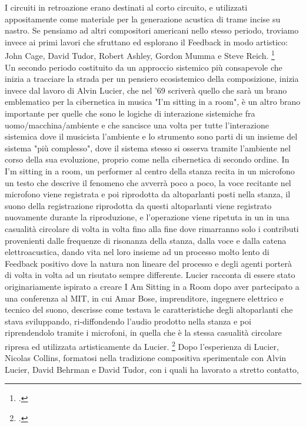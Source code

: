 I circuiti in retroazione erano destinati al corto circuito,
e utilizzati appositamente come materiale per la generazione acustica
di trame incise su nastro.
Se pensiamo ad altri compositori americani nello stesso periodo,
troviamo invece ai primi lavori che sfruttano
ed esplorano il Feedback in modo artistico:
John Cage, David Tudor, Robert Ashley, Gordon Mumma e Steve Reich.
\footcite{sanfilippovallefeedsys} \\
Un secondo periodo costituito da un approccio sistemico più consapevole
che inizia a tracciare la strada per un pensiero ecosistemico della composizione,
inizia invece dal lavoro
di Alvin Lucier, che nel '69 scriverà quello che sarà un brano emblematico per
la cibernetica in musica "I'm sitting in a room",
è un altro brano importante per quelle che sono
le logiche di interazione sistemiche fra uomo/macchina/ambiente
e che sancisce una volta per tutte
l'interazione sistemica dove il musicista l'ambiente e lo strumento
sono parti di un insieme del sistema "più complesso",
dove il sistema stesso si osserva tramite l'ambiente nel corso della sua
evoluzione,
proprio come nella cibernetica di secondo ordine.
In I'm sitting in a room, un performer al centro della stanza
recita in un microfono un testo che descrive il fenomeno che avverrà poco a poco,
la voce recitante nel microfono viene registrata e poi riprodotta da altoparlanti
posti nella stanza, il suono della registrazione riprodotta da questi altoparlanti
viene registrato nuovamente durante la riproduzione, e l'operazione
viene ripetuta in un in una casualità circolare di volta in volta
fino alla fine dove rimarranno
solo i contributi provenienti dalle frequenze di risonanza della stanza,
dalla voce e dalla catena elettroacustica,
dando vita nel loro insieme ad un processo molto lento di Feedback positivo dove
la natura non lineare del processo e degli agenti porterà di volta in volta ad un risutato
sempre differente.
Lucier racconta di essere stato originariamente ispirato
a creare I Am Sitting in a Room dopo aver partecipato a una conferenza al MIT,
in cui Amar Bose, imprenditore, ingegnere elettrico e tecnico del suono,
descrisse come testava le caratteristiche degli altoparlanti
che stava sviluppando, ri-diffondendo l'audio prodotto nella stanza e poi
riprendendolo tramite i microfoni, in quella che è la stessa casualità
circolare ripresa ed utilizzata artisticamente da Lucier. \footcite{lucierbose}
Dopo l'esperienza di Lucier, Nicolas Collins,
formatosi nella tradizione compositiva sperimentale con Alvin Lucier,
David Behrman e David Tudor, con i quali ha lavorato a stretto contatto,
